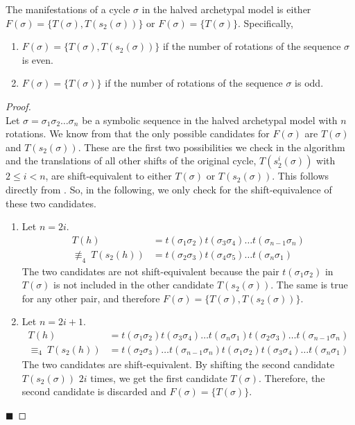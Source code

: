 \begin{theorem}
	\label{theorem:coexistence.even}
	The manifestations of a cycle $\sigma$ in the halved archetypal model is either $F(\sigma) = \{T(\sigma), T(s_2(\sigma))\}$ or $F(\sigma) = \{T(\sigma)\}$.
	Specifically, \begin{enumerate}
		\item $F(\sigma) = \{T(\sigma), T(s_2(\sigma))\}$ if the number of rotations of the sequence $\sigma$ is even.
		\item $F(\sigma) = \{T(\sigma)\}$ if the number of rotations of the sequence $\sigma$ is odd.
	\end{enumerate}
\end{theorem}

\begin{proof} \phantom{x} \\
	Let $\sigma = \sigma_1\sigma_2 \dots \sigma_n$ be a symbolic sequence in the halved archetypal model with $n$ rotations.
	We know from  that the only possible candidates for $F(\sigma)$ are $T(\sigma)$ and $T(s_2(\sigma))$.
	These are the first two possibilities we check in the algorithm and the translations of all other shifts of the original cycle, $T(s_2^i(\sigma))$ with $2 \leq i < n$, are shift-equivalent to either $T(\sigma)$ or $T(s_2(\sigma))$.
	This follows directly from .
	So, in the following, we only check for the shift-equivalence of these two candidates.
	\begin{enumerate}
		\item Let $n = 2i$.
		      \begin{align*}
			      T(h)                   & = t(\sigma_1\sigma_2) t(\sigma_3\sigma_4) \dots t(\sigma_{n-1}\sigma_n) \\
			      \nequiv_4 \: T(s_2(h)) & = t(\sigma_2\sigma_3) t(\sigma_4\sigma_5) \dots t(\sigma_n\sigma_1)
		      \end{align*}
		      The two candidates are not shift-equivalent because the pair $t(\sigma_1\sigma_2)$ in $T(\sigma)$ is not included in the other candidate $T(s_2(\sigma))$.
		      The same is true for any other pair, and therefore $F(\sigma) = \{T(\sigma), T(s_2(\sigma))\}$.
		\item Let $n = 2i + 1$.
		      \begin{align*}
			      T(h)                  & = t(\sigma_1\sigma_2) t(\sigma_3\sigma_4) \dots t(\sigma_n\sigma_1) t(\sigma_2\sigma_3) \dots t(\sigma_{n-1}\sigma_n) \\
			      \equiv_4 \: T(s_2(h)) & = t(\sigma_2\sigma_3) \dots t(\sigma_{n-1}\sigma_n) t(\sigma_1\sigma_2) t(\sigma_3\sigma_4) \dots t(\sigma_n\sigma_1)
		      \end{align*}
		      The two candidates are shift-equivalent.
		      By shifting the second candidate $T(s_2(\sigma))$ $2i$ times, we get the first candidate $T(\sigma)$.
		      Therefore, the second candidate is discarded and $F(\sigma) = \{T(\sigma)\}$.
	\end{enumerate}
	\hfill $\blacksquare$
\end{proof}

